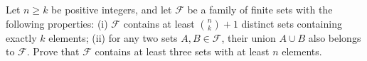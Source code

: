 Let \(n\ge k\) be positive integers, and let \(\mathcal{F}\) be a family of finite sets with the following properties:
(i) \(\mathcal{F}\) contains at least \(\binom{n}{k}+1\) distinct sets containing exactly \(k\) elements;
(ii) for any two sets \(A, B\in \mathcal{F}\), their union \(A\cup B\) also belongs to \(\mathcal{F}\).
Prove that \(\mathcal{F}\) contains at least three sets with at least \(n\) elements.